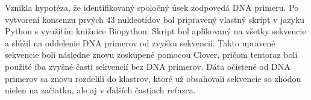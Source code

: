 Vznikla hypotéza, že identifikovaný spoločný úsek zodpovedá DNA primeru. %
Po vytvorení konsenzu prvých 43 nukleotidov bol pripravený vlastný skript v jazyku Python s využitím knižnice Biopython.
Skript bol aplikovaný na všetky sekvencie a slúžil na oddelenie DNA primerov od zvyšku sekvencií.
Takto upravené sekvencie boli následne znovu zoskupené pomocou Clover, pričom tentoraz boli použité iba zvyšné časti sekvencií bez DNA primerov.
Dáta očistené od DNA primerov sa znovu rozdelili do klastrov, ktoré už obsahovali sekvencie so zhodou nielen na začiatku, ale aj v ďalších častiach reťazca.
